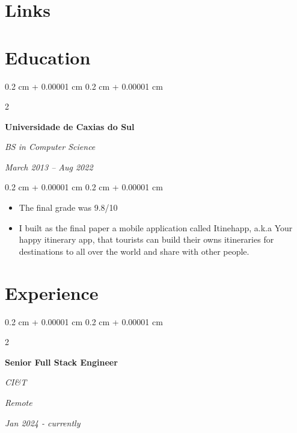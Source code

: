 \documentclass[10pt, letterpaper]{article}
\newenvironment{highlights}{
    \begin{itemize}[
        topsep=0.10 cm,
        parsep=0.10 cm,
        partopsep=0pt,
        itemsep=0pt,
        leftmargin=0.4 cm + 10pt
    ]
}{
    \end{itemize}
} %
\newenvironment{onecolentry}{
    \begin{adjustwidth}{
        0.2 cm + 0.00001 cm
    }{
        0.2 cm + 0.00001 cm
    }
}{
    \end{adjustwidth}
} %
\newenvironment{twocolentry}[2][]{
    \onecolentry
    \def\secondColumn{#2}
    \setcolumnwidth{\fill, 4.5 cm}
    \begin{paracol}{2}
}{
    \switchcolumn \raggedleft \secondColumn
    \end{paracol}
    \endonecolentry
} %
\begin{document}
        \vspace{0.2 cm}
    
    \section{Links}

    \section{Education}


        \begin{twocolentry}{
            
            
        \textit{March 2013 – Aug 2022}}
            \textbf{Universidade de Caxias do Sul}

            \textit{BS in Computer Science}
        \end{twocolentry}

        \vspace{0.10 cm}
        \begin{onecolentry}
            \begin{highlights}
                \item The final grade was 9.8/10
                \item I built as the final paper a mobile application called Itinehapp, a.k.a Your happy itinerary app, that tourists can build their owns itineraries for destinations to all over the world and share with other people.
            \end{highlights}
        \end{onecolentry}



    
    \section{Experience}

        \begin{twocolentry}{
        \textit{Remote}    
            
        \textit{Jan 2024 - currently}}
            \textbf{Senior Full Stack Engineer}
            
            \textit{CI\&T}
        \end{twocolentry}
\end{document}
